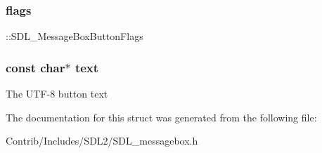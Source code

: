 \subsubsection[{\texorpdfstring{flags}{flags}}]{ flags}\hypertarget{struct_s_d_l___message_box_button_data_a048097c5cc2146ce1ff2450684f1b51c}{}\label{struct_s_d_l___message_box_button_data_a048097c5cc2146ce1ff2450684f1b51c}
\+::\+S\+D\+L\+\_\+\+Message\+Box\+Button\+Flags 
\subsubsection[{\texorpdfstring{text}{text}}]{\setlength{\rightskip}{0pt plus 5cm}const char$\ast$ text}\hypertarget{struct_s_d_l___message_box_button_data_a16343090e80c4472521560f30113d96c}{}\label{struct_s_d_l___message_box_button_data_a16343090e80c4472521560f30113d96c}
The U\+T\+F-\/8 button text 

The documentation for this struct was generated from the following file\+:\begin{DoxyCompactItemize}
\item 
Contrib/\+Includes/\+S\+D\+L2/S\+D\+L\+\_\+messagebox.\+h\end{DoxyCompactItemize}

